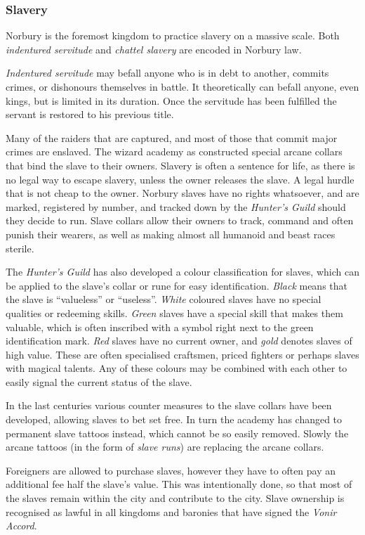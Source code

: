\subsubsection*{Slavery}

Norbury is the foremost kingdom to practice slavery on a massive scale. Both
\emph{indentured servitude} and \emph{chattel slavery} are encoded in Norbury
law.

\emph{Indentured servitude} may befall anyone who is in debt to another,
commits crimes, or dishonours themselves in battle. It theoretically can
befall anyone, even kings, but is limited in its duration. Once the servitude
has been fulfilled the servant is restored to his previous title.

Many of the raiders that are captured, and most of those that commit major
crimes are enslaved. The wizard academy as constructed special arcane collars
that bind the slave to their owners. Slavery is often a sentence for life, as
there is no legal way to escape slavery, unless the owner releases the slave.
A legal hurdle that is not cheap to the owner. Norbury slaves have no rights
whatsoever, and are marked, registered by number, and tracked down by the
\emph{Hunter's Guild} should they decide to run. Slave collars allow their
owners to track, command and often punish their wearers, as well as making
almost all humanoid and beast races sterile.

The \emph{Hunter's Guild} has also developed a colour classification for
slaves, which can be applied to the slave's collar or rune for easy
identification.  \emph{Black} means that the slave is ``valueless'' or
``useless''. \emph{White} coloured slaves have no special qualities or
redeeming skills. \emph{Green} slaves have a special skill that makes them
valuable, which is often inscribed with a symbol right next to the green
identification mark. \emph{Red} slaves have no current owner, and \emph{gold}
denotes slaves of high value. These are often specialised craftsmen, priced
fighters or perhaps slaves with magical talents. Any of these colours may be
combined with each other to easily signal the current status of the slave.

In the last centuries various counter measures to the slave collars have been
developed, allowing slaves to bet set free. In turn the academy has changed to
permanent slave tattoos instead, which cannot be so easily removed. Slowly the
arcane tattoos (in the form of \emph{slave runs}) are replacing the arcane
collars.

Foreigners are allowed to purchase slaves, however they have to often pay an
additional fee half the slave's value. This was intentionally done, so that
most of the slaves remain within the city and contribute to the city. Slave
ownership is recognised as lawful in all kingdoms and baronies that have signed
the \emph{Vonir Accord}.

